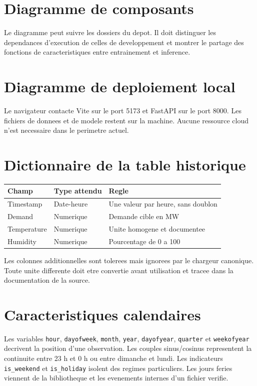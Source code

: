 \clearpage
\section{Diagramme de composants}
Le diagramme peut suivre les dossiers du depot. Il doit distinguer les dependances d'execution de celles de developpement et montrer le partage des fonctions de caracteristiques entre entrainement et inference.

\clearpage
\section{Diagramme de deploiement local}
Le navigateur contacte Vite sur le port 5173 et FastAPI sur le port 8000. Les fichiers de donnees et de modele restent sur la machine. Aucune ressource cloud n'est necessaire dans le perimetre actuel.

\clearpage
\section{Dictionnaire de la table historique}
\begin{longtable}{p{3.2cm}p{3cm}p{7cm}}
\toprule Champ & Type attendu & Regle\\\midrule
Timestamp & Date-heure & Une valeur par heure, sans doublon\\
Demand & Numerique & Demande cible en MW\\
Temperature & Numerique & Unite homogene et documentee\\
Humidity & Numerique & Pourcentage de 0 a 100\\
\bottomrule
\end{longtable}
Les colonnes additionnelles sont tolerees mais ignorees par le chargeur canonique. Toute unite differente doit etre convertie avant utilisation et tracee dans la documentation de la source.

\clearpage
\section{Caracteristiques calendaires}
Les variables \texttt{hour}, \texttt{dayofweek}, \texttt{month}, \texttt{year}, \texttt{dayofyear}, \texttt{quarter} et \texttt{weekofyear} decrivent la position d'une observation. Les couples sinus/cosinus representent la continuite entre 23 h et 0 h ou entre dimanche et lundi. Les indicateurs \texttt{is\_weekend} et \texttt{is\_holiday} isolent des regimes particuliers. Les jours feries viennent de la bibliotheque et les evenements internes d'un fichier verifie.


